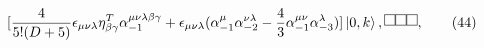 \begin{equation}
\lbrack \frac{4}{5!(D+5)}\epsilon _{\mu \nu \lambda }\eta _{\beta \gamma
}^{T}\alpha _{-1}^{\mu \nu \lambda \beta \gamma }+\epsilon _{\mu \nu \lambda
}(\alpha _{-1}^{\mu }\alpha _{-2}^{\nu \lambda }-\frac{4}{3}\alpha
_{-1}^{\mu \nu }\alpha _{-3}^{\lambda })]\left\vert 0,k\right\rangle ,%
\raisebox{0.06in}{\fbox{\rule[0.04cm]{0.04cm}{0cm}}}\raisebox{0.06in}{\fbox{%
\rule[0.04cm]{0.04cm}{0cm}}}\raisebox{0.06in}{\fbox{%
\rule[0.04cm]{0.04cm}{0cm}}},  \tag{44}
\end{equation}

